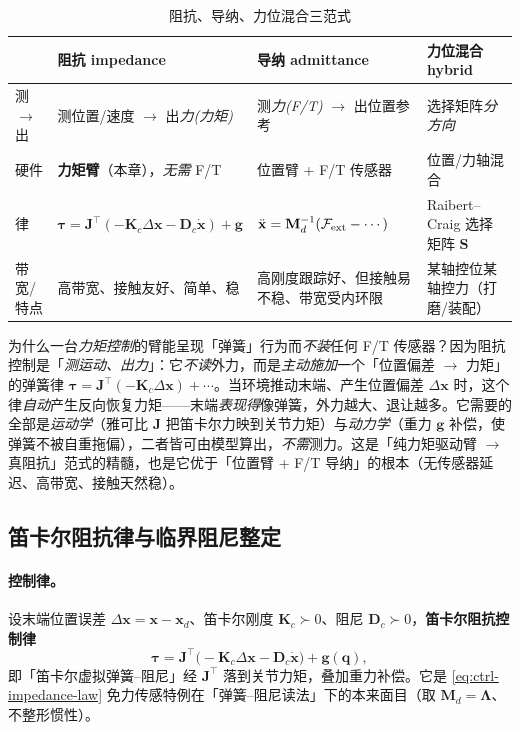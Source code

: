 \begin{table}[H]\centering\small
\caption{阻抗、导纳、力位混合三范式}
\label{tab:actrl-imp-adm}
\begin{tabular}{p{} p{} p{} p{}}
\toprule
 & 阻抗 impedance & 导纳 admittance & 力位混合 hybrid \\
\midrule
测$\to$出 & 测位置/速度 $\to$ 出\emph{力(力矩)} & 测\emph{力(F/T)} $\to$ 出位置参考 & 选择矩阵\emph{分方向} \\
硬件 & \textbf{力矩臂}（本章），\emph{无需} F/T & 位置臂 + F/T 传感器 & 位置/力轴混合 \\
律 & $\boldsymbol{\tau}=\mathbf{J}^\top(-\mathbf{K}_c\Delta\mathbf{x}-\mathbf{D}_c\dot{\mathbf{x}})+\mathbf{g}$ & $\ddot{\mathbf{x}}=\mathbf{M}_d^{-1}(\mathcal{F}_{\rm ext}-\cdots)$ & Raibert--Craig 选择矩阵 $\mathbf{S}$ \\
带宽/特点 & 高带宽、接触友好、简单、稳 & 高刚度跟踪好、但接触易不稳、带宽受内环限 & 某轴控位某轴控力（打磨/装配）\\
\bottomrule
\end{tabular}
\end{table}

\begin{insight}
为什么一台\emph{力矩控制}的臂能呈现「弹簧」行为而\emph{不装}任何 F/T 传感器？因为阻抗控制是「\emph{测运动、出力}」：它\emph{不读}外力，而是\emph{主动施加}一个「位置偏差 $\to$ 力矩」的弹簧律 $\boldsymbol{\tau}=\mathbf{J}^\top(-\mathbf{K}_c\Delta\mathbf{x})+\cdots$。当环境推动末端、产生位置偏差 $\Delta\mathbf{x}$ 时，这个律\emph{自动}产生反向恢复力矩——末端\emph{表现得}像弹簧，外力越大、退让越多。它需要的全部是\emph{运动学}（雅可比 $\mathbf{J}$ 把笛卡尔力映到关节力矩）与\emph{动力学}（重力 $\mathbf{g}$ 补偿，使弹簧不被自重拖偏），二者皆可由模型算出，\emph{不需}测力。这是「纯力矩驱动臂 $\to$ 真阻抗」范式的精髓，也是它优于「位置臂 + F/T 导纳」的根本（无传感器延迟、高带宽、接触天然稳）。
\end{insight}

\subsection{笛卡尔阻抗律与临界阻尼整定}
\label{sec:actrl-cartimp}

\paragraph{控制律。}
设末端位置误差 $\Delta\mathbf{x}=\mathbf{x}-\mathbf{x}_d$、笛卡尔刚度 $\mathbf{K}_c\succ0$、阻尼 $\mathbf{D}_c\succ0$，\textbf{笛卡尔阻抗控制律}
\begin{equation}
  \boxed{\boldsymbol{\tau}=\mathbf{J}^\top\big(-\mathbf{K}_c\Delta\mathbf{x}-\mathbf{D}_c\dot{\mathbf{x}}\big)+\mathbf{g}(\mathbf{q}),}
  \label{eq:actrl-cartimp}
\end{equation}
即「笛卡尔虚拟弹簧--阻尼」经 $\mathbf{J}^\top$ 落到关节力矩，叠加重力补偿。它是 \cref{eq:ctrl-impedance-law} 免力传感特例在「弹簧--阻尼读法」下的本来面目（取 $\mathbf{M}_d=\boldsymbol{\Lambda}$、不整形惯性）。

